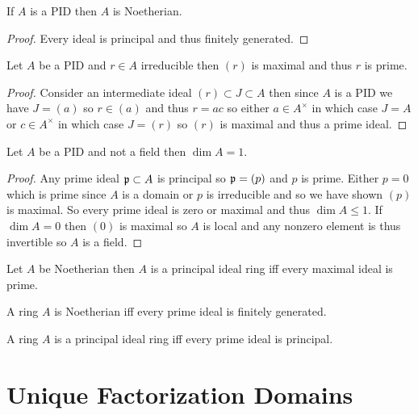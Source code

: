 \documentclass[12pt]{article}
\begin{document}
\begin{lemma}
If $A$ is a PID then $A$ is Noetherian.
\end{lemma}

\begin{proof}
Every ideal is principal and thus finitely generated.
\end{proof}

\begin{lemma}
Let $A$ be a PID and $r \in A$ irreducible then $(r)$ is maximal and thus $r$ is prime. 
\end{lemma}

\begin{proof}
Consider an intermediate ideal $(r) \subset J \subset A$ then since $A$ is a PID we have $J = (a)$ so $r \in (a)$ and thus $r = ac$ so either $a \in A^\times$ in which case $J = A$ or $c \in A^\times$ in which case $J = (r)$ so $(r)$ is maximal and thus a prime ideal.
\end{proof}

\begin{theorem}
Let $A$ be a PID and not a field then $\dim{A} = 1$.
\end{theorem}

\begin{proof}
Any prime ideal $\mathfrak{p} \subset A$ is principal so $\mathfrak{p} = (p)$ and $p$ is prime. Either $p = 0$ which is prime since $A$ is a domain or $p$ is irreducible and so we have shown $(p)$ is maximal. So every prime ideal is zero or maximal and thus $\dim{A} \le 1$. If $\dim{A} = 0$ then $(0)$ is maximal so $A$ is local and any nonzero element is thus invertible so $A$ is a field. 
\end{proof}

\begin{theorem}[Kaplansky]
Let $A$ be Noetherian then $A$ is a principal ideal ring iff every maximal ideal is prime.
\end{theorem}

\begin{theorem}[Cohen]
A ring $A$ is Noetherian iff every prime ideal is finitely generated.
\end{theorem}

\begin{corollary}
A ring $A$ is a principal ideal ring iff every prime ideal is principal. 
\end{corollary}

\section{Unique Factorization Domains}
\end{document}
